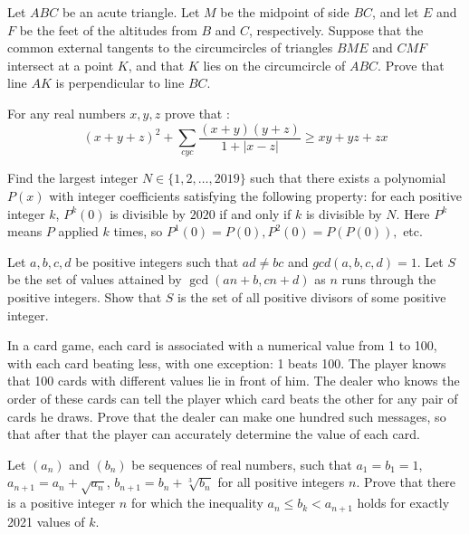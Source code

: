 \documentclass[11pt]{scrartcl}
\begin{document}
\begin{problem}[4018921933875333744]
	Let $ABC$ be an acute triangle. Let $M$ be the midpoint of side $BC$, and let $E$ and $F$ be the feet of the altitudes from $B$ and $C$, respectively. Suppose that the common external tangents to the circumcircles of triangles $BME$ and $CMF$ intersect at a point $K$, and that $K$ lies on the circumcircle of $ABC$. Prove that line $AK$ is perpendicular to line $BC$.
\end{problem}
\begin{problem}[4019368976099617559]
For any real numbers $x , y ,z$ prove that :
$$(x+y+z)^2 + \sum_{cyc}{\frac{(x+y)(y+z)}{1+|x-z|}} \ge xy+yz+zx$$
\end{problem}
\begin{problem}[4037864050528368034]
Find the largest integer $N \in \{1, 2, \ldots , 2019 \}$ such that there exists a polynomial $P(x)$ with integer coefficients satisfying the following property: for each positive integer $k$, $P^k(0)$ is divisible by $2020$ if and only if $k$ is divisible by $N$. Here $P^k$ means $P$ applied $k$ times, so $P^1(0)=P(0), P^2(0)=P(P(0)),$ etc.
\end{problem}
\begin{problem}[4056351287962212080]
	Let $a,b,c,d$ be positive integers such that $ad \neq bc$ and $gcd(a,b,c,d)=1$. Let $S$ be the set of values attained by $\gcd(an+b,cn+d)$ as $n$ runs through the positive integers. Show that $S$ is the set of all positive divisors of some positive integer.
\end{problem}
\begin{problem}[4059278924956282558]
In a card game, each card is associated with a numerical value from 1 to 100, with each card beating less, with one exception: 1 beats 100. The player knows that 100 cards with different values lie in front of him. The dealer who knows the order of these cards can tell the player which card beats the other for any pair of cards he draws. Prove that the dealer can make one hundred such messages, so that after that the player can accurately determine the value of each card.
\end{problem}
\begin{problem}[4092499142055802609]
	Let $(a_n)$ and $(b_n)$ be sequences of real numbers, such that $a_1 = b_1 = 1$, $a_{n+1} = a_n + \sqrt{a_n}$, $b_{n+1} = b_n + \sqrt[3]{b_n}$ for all positive integers $n$. Prove that there is a positive integer $n$ for which the inequality $a_n \leq b_k < a_{n+1}$ holds for exactly 2021 values of $k$.
\end{problem}
\end{document}
